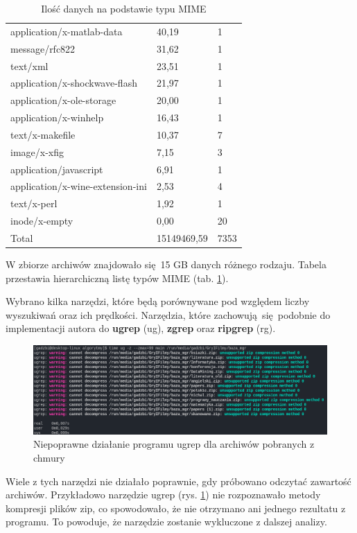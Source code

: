 \begin{table}[p]
\begin{tabular}{|l|l|l|}
application/x-matlab-data & 40,19 & 1 \\
message/rfc822 & 31,62 & 1 \\
text/xml & 23,51 & 1 \\
application/x-shockwave-flash & 21,97 & 1 \\
application/x-ole-storage & 20,00 & 1 \\
application/x-winhelp & 16,43 & 1 \\
text/x-makefile & 10,37 & 7 \\
image/x-xfig & 7,15 & 3 \\
application/javascript & 6,91 & 1 \\
application/x-wine-extension-ini & 2,53 & 4 \\
text/x-perl & 1,92 & 1 \\
inode/x-empty & 0,00 & 20 \\
        \hline
Total & 15149469,59 & 7353 \\
        \hline
    \end{tabular}
    \caption{Ilość danych na podstawie typu MIME}
    \label{tabela:typy-MIME-z-iloscia}
\end{table}

W zbiorze archiwów znajdowało się 15 GB danych różnego rodzaju. Tabela 
przestawia hierarchiczną listę typów MIME (tab. \ref{tabela:typy-MIME-z-iloscia}).

Wybrano kilka narzędzi, które będą porównywane pod względem liczby wyszukiwań
oraz ich prędkości. Narzędzia, które zachowują się podobnie do implementacji
autora do \textbf{ugrep} (ug), \textbf{zgrep} oraz \textbf{ripgrep} (rg). 

\begin{figure}[htbp]
\centering
\includegraphics[width=1\textwidth]{./images/ugrep-errors.png}
\caption{Niepoprawne działanie programu ugrep dla archiwów pobranych z chmury}
\label{fig:ugrepErrors}
\end{figure}

Wiele z tych narzędzi nie działało poprawnie, gdy próbowano odczytać zawartość
archiwów. Przykładowo narzędzie ugrep (rys. \ref{fig:ugrepErrors}) nie rozpoznawało 
metody kompresji plików zip, co spowodowało, że nie otrzymano ani 
jednego rezultatu z programu. To powoduje, że narzędzie zostanie wykluczone z 
dalszej analizy.

